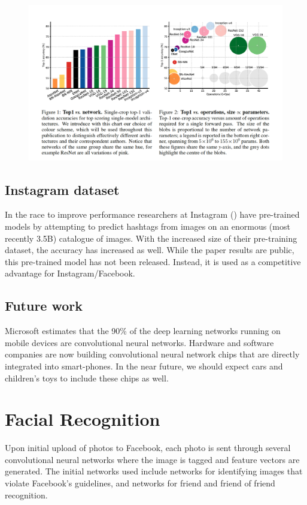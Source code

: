 \begin{figure}[!ht]
  \includegraphics[width=\textwidth]{figs/ic_01.png}
  \caption{}
  \label{fig:acc_complexity}
\end{figure}

\subsection{Instagram dataset}\label{subsection:o_instagram}
In the race to improve performance researchers at Instagram (\cite{DBLP:journals/corr/abs-1805-00932}) have pre-trained models by attempting to predict hashtags from images on an enormous (most recently 3.5B) catalogue of images.  
With the increased size of their pre-training dataset, the accuracy has increased as well.  
While the paper results are public, this pre-trained model has not been released. Instead, it is used as a competitive advantage for Instagram/Facebook.
 

\subsection{Future work}\label{subsection:o_futureWork}
Microsoft estimates that the 90\% of the deep learning networks running on mobile devices are convolutional neural networks.  
Hardware and software companies are now building convolutional neural network chips that are directly integrated into smart-phones.  
In the near future, we should expect cars and children's toys to include these chips as well.

\section{Facial Recognition}\label{section:facialRecognition}
Upon initial upload of photos to Facebook, each photo is sent through several convolutional neural networks where the image is tagged and feature vectors are generated.  
The initial networks used include networks for identifying images that violate Facebook's guidelines, and networks for friend and friend of friend recognition.  


